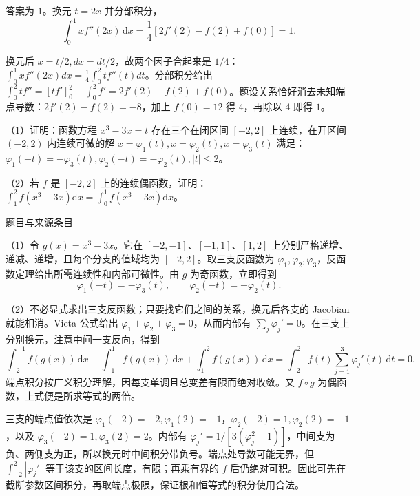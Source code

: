 \documentclass[12pt,fontset=fandol]{ctexart}
\begin{document}
\begin{solve}\label{ans:fin11-high:2}

答案为 $1$。换元 $t=2x$ 并分部积分，
\[
\int_0^1xf''(2x)\,\mathrm dx=\frac14[2f'(2)-f(2)+f(0)]=1.
\]

换元后 $x=t/2,dx=dt/2$，故两个因子合起来是 $1/4$：$\int_0^1xf''(2x)dx=\tfrac14\int_0^2tf''(t)dt$。分部积分给出 $\int_0^2tf''=[tf']_0^2-\int_0^2f'=2f'(2)-f(2)+f(0)$。题设关系恰好消去未知端点导数：$2f'(2)-f(2)=-8$，加上 $f(0)=12$ 得 $4$，再除以 $4$ 即得 $1$。

\end{solve}

\begin{example}[来源序号7]\label{ex:fin11-high:7}\label{pr:fin11-high:7}

（1）证明：函数方程 $x^{3} - 3x = t$ 存在三个在闭区间 $[-2,2]$ 上连续，在开区间 $(-2,2)$ 内连续可微的解 $x = \varphi_{1}(t), x = \varphi_{2}(t), x = \varphi_{3}(t)$ 满足：
$\varphi_{1}(-t) = -\varphi_{3}(t), \varphi_{2}(-t) = -\varphi_{2}(t), |t| \leq 2$。

（2）若 $f$ 是 $[-2,2]$ 上的连续偶函数，证明：
$\int_{1}^{2} f\left(x^{3} - 3x\right) \mathrm{d} x = \int_{0}^{1} f\left(x^{3} - 3x\right) \mathrm{d} x$。

\par\href{https://github.com/lzxcr/cmc-mathematics/blob/64916fa1fdbc3e444a652eca204d5669058ee321/src/problems/finals/11/07.md}{题目与来源条目}

\end{example}

\begin{solve}\label{ans:fin11-high:7}

（1）令 $g(x)=x^3-3x$。它在 $[-2,-1]$、$[-1,1]$、$[1,2]$ 上分别严格递增、递减、递增，且每个分支的值域均为 $[-2,2]$。取三支反函数为 $\varphi_1,\varphi_2,\varphi_3$，反函数定理给出所需连续性和内部可微性。由 $g$ 为奇函数，立即得到
\[
\varphi_1(-t)=-\varphi_3(t),\qquad\varphi_2(-t)=-\varphi_2(t).
\]

（2）不必显式求出三支反函数；只要找它们之间的关系，换元后各支的 Jacobian 就能相消。Vieta 公式给出 $\varphi_1+\varphi_2+\varphi_3=0$，从而内部有 $\sum_j\varphi_j'=0$。在三支上分别换元，注意中间一支反向，得到
\[
\int_{-2}^{-1}f(g(x))\,\mathrm dx-\int_{-1}^{1}f(g(x))\,\mathrm dx+\int_1^2f(g(x))\,\mathrm dx
=\int_{-2}^2f(t)\sum_{j=1}^3\varphi_j'(t)\,\mathrm dt=0.
\]
端点积分按广义积分理解，因每支单调且总变差有限而绝对收敛。又 $f\circ g$ 为偶函数，上式便是所求等式的两倍。

三支的端点值依次是 $\varphi_1(-2)=-2,\varphi_1(2)=-1$，$\varphi_2(-2)=1,\varphi_2(2)=-1$，以及 $\varphi_3(-2)=1,\varphi_3(2)=2$。内部有 $\varphi_j'=1/[3(\varphi_j^2-1)]$，中间支为负、两侧支为正，所以换元时中间积分带负号。端点处导数可能无界，但 $\int_{-2}^2|\varphi_j'|$ 等于该支的区间长度，有限；再乘有界的 $f$ 后仍绝对可积。因此可先在截断参数区间积分，再取端点极限，保证根和恒等式的积分使用合法。

\end{solve}
\end{document}
